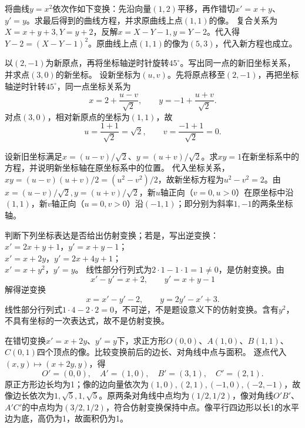 将曲线\(y=x^2\)依次作如下变换：先沿向量\((1,2)\)平移，再作错切\(x'=x+y\)、\(y'=y\)。求最后得到的曲线方程，并求原曲线上点\((1,1)\)的像。
\solutionanswer
复合关系为\(X=x+y+3,Y=y+2\)，反解\(x=X-Y-1,y=Y-2\)。代入得\(Y-2=(X-Y-1)^2\)。原曲线上点\((1,1)\)的像为\((5,3)\)，代入新方程也成立。


以\((2,-1)\)为新原点，再将坐标轴逆时针旋转\(45^\circ\)。写出同一点的新旧坐标关系，并求点\((3,0)\)的新坐标。
\solutionanswer
设新坐标为\((u,v)\)。先将原点移至\((2,-1)\)，再把坐标轴逆时针转\(45^\circ\)，同一点坐标关系为
\[x=2+\frac{u-v}{\sqrt2},\qquad y=-1+\frac{u+v}{\sqrt2}.\]
对点\((3,0)\)，相对新原点的坐标为\((1,1)\)，故
\[u=\frac{1+1}{\sqrt2}=\sqrt2,\qquad v=\frac{-1+1}{\sqrt2}=0.\]


设新旧坐标满足\(x=(u-v)/\sqrt2\)、\(y=(u+v)/\sqrt2\)。求\(xy=1\)在新坐标系中的方程，并说明新坐标轴在原坐标系中的位置。
\solutionanswer
代入坐标关系，\(xy=(u-v)(u+v)/2=(u^2-v^2)/2\)，故新坐标方程为\(u^2-v^2=2\)。由\(x=(u-v)/\sqrt2,y=(u+v)/\sqrt2\)，新\(u\)轴正向（\(v=0,u>0\)）在原坐标中沿\((1,1)\)，新\(v\)轴正向（\(u=0,v>0\)）沿\((-1,1)\)；即分别为斜率\(1,-1\)的两条坐标轴。


判断下列坐标表达是否给出仿射变换；若是，写出逆变换：\\
\(x'=2x+y+1\)，\(y'=x+y-1\)；\\
\(x'=x+2y\)，\(y'=2x+4y+1\)；\\
\(x'=x+y^2\)，\(y'=y\)。
\solutionanswer
{}线性部分行列式为\(2\cdot1-1\cdot1=1\ne0\)，是仿射变换。由
\[x'-y'=x+2,\qquad y'=x+y-1\]
解得逆变换
\[x=x'-y'-2,\qquad y=2y'-x'+3.\]
线性部分行列式\(1\cdot4-2\cdot2=0\)，不可逆，不是题设意义下的仿射变换。含有\(y^2\)，不具有坐标的一次表达式，故不是仿射变换。


在错切变换\(x'=x+2y\)、\(y'=y\)下，求正方形\(O(0,0)\)、\(A(1,0)\)、\(B(1,1)\)、\(C(0,1)\)四个顶点的像。比较变换前后的边长、对角线中点与面积。
\solutionanswer
逐点代入\((x,y)\mapsto(x+2y,y)\)，得
\[O'=(0,0),\quad A'=(1,0),\quad B'=(3,1),\quad C'=(2,1).\]
原正方形边长均为1；像的边向量依次为\((1,0),(2,1),(-1,0),(-2,-1)\)，故像边长依次为\(1,\sqrt5,1,\sqrt5\)。原两条对角线中点均为\((1/2,1/2)\)，像对角线\(O'B'\)、\(A'C'\)的中点均为\((3/2,1/2)\)，符合仿射变换保持中点。像平行四边形以长1的水平边为底，高仍为1，故面积仍为1。


